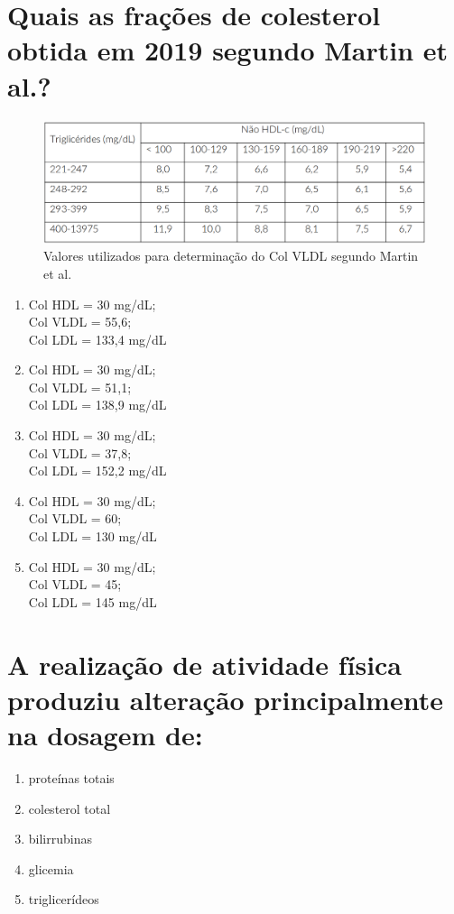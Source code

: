 \documentclass[11pt,notitlepage]{article}
\begin{document}
\section{Quais as frações de colesterol obtida em 2019 segundo Martin et al.?}
\begin{figure}[H]
	\centering
	\includegraphics[scale=0.32]{q46.png}
	\caption{Valores utilizados para determinação do Col VLDL segundo Martin et al. }
	\label{fig:link de chamada}
\end{figure}
\begin{multicols}{2}
	\setlength{\columnseprule}{0pt}
	\begin{enumerate}[label=(\alph*)]
		\item Col HDL = 30 mg/dL; \\Col VLDL = 55,6; \\Col LDL = 133,4 mg/dL
		\item Col HDL = 30 mg/dL; \\Col VLDL = 51,1; \\Col LDL = 138,9 mg/dL
		\item Col HDL = 30 mg/dL; \\Col VLDL = 37,8; \\Col LDL = 152,2 mg/dL
		\item Col HDL = 30 mg/dL; \\Col VLDL = 60; \\Col LDL = 130 mg/dL
		\item Col HDL = 30 mg/dL; \\Col VLDL = 45; \\Col LDL = 145 mg/dL
	\end{enumerate}
\end{multicols}
\vspace{0.5cm}

\section{A realização de atividade física produziu alteração principalmente na dosagem de:}
\begin{multicols}{2}
	\setlength{\columnseprule}{0pt}
	\begin{enumerate}[label=(\alph*)]
		\item proteínas totais
		\item colesterol total
		\item bilirrubinas
		\item glicemia
		\item triglicerídeos
	\end{enumerate}
\end{multicols}
\vspace{0.5cm}
\end{document}

